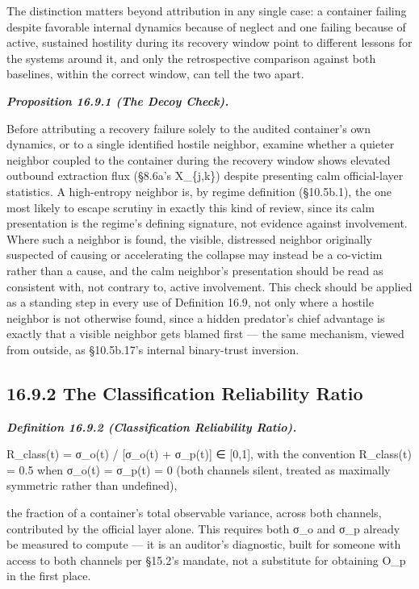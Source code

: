 \documentclass[
]{article}
\begin{document}
The distinction matters beyond attribution in any single case: a
container failing despite favorable internal dynamics because of neglect
and one failing because of active, sustained hostility during its
recovery window point to different lessons for the systems around it,
and only the retrospective comparison against both baselines, within the
correct window, can tell the two apart.

\emph{\textbf{Proposition 16.9.1 (The Decoy Check).}}

Before attributing a recovery failure solely to the audited container's
own dynamics, or to a single identified hostile neighbor, examine
whether a quieter neighbor coupled to the container during the recovery
window shows elevated outbound extraction flux (§8.6a's X\_\{j,k\})
despite presenting calm official-layer statistics. A high-entropy
neighbor is, by regime definition (§10.5b.1), the one most likely to
escape scrutiny in exactly this kind of review, since its calm
presentation is the regime's defining signature, not evidence against
involvement. Where such a neighbor is found, the visible, distressed
neighbor originally suspected of causing or accelerating the collapse
may instead be a co-victim rather than a cause, and the calm neighbor's
presentation should be read as consistent with, not contrary to, active
involvement. This check should be applied as a standing step in every
use of Definition 16.9, not only where a hostile neighbor is not
otherwise found, since a hidden predator's chief advantage is exactly
that a visible neighbor gets blamed first --- the same mechanism, viewed
from outside, as §10.5b.17's internal binary-trust inversion.

\hypertarget{the-classification-reliability-ratio}{%
\subsection{16.9.2 The Classification Reliability
Ratio}\label{the-classification-reliability-ratio}}

\emph{\textbf{Definition 16.9.2 (Classification Reliability Ratio).}}

R\_class(t) = σ\_o(t) / {[}σ\_o(t) + σ\_p(t){]} ∈ {[}0,1{]}, with the
convention R\_class(t) = 0.5 when σ\_o(t) = σ\_p(t) = 0 (both channels
silent, treated as maximally symmetric rather than undefined),

the fraction of a container's total observable variance, across both
channels, contributed by the official layer alone. This requires both
σ\_o and σ\_p already be measured to compute --- it is an auditor's
diagnostic, built for someone with access to both channels per §15.2's
mandate, not a substitute for obtaining O\_p in the first place.
\end{document}
